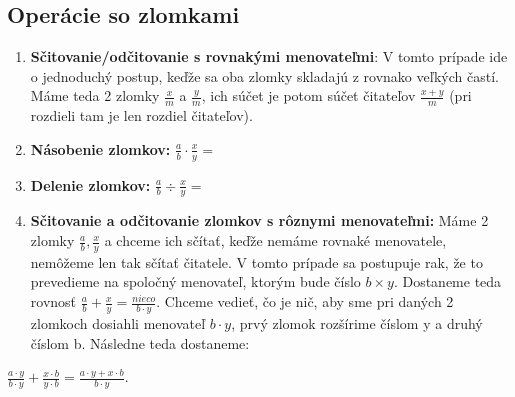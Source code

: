 \documentclass[12pt]{article}
\begin{document}
	\newpage
	\subsection{Operácie so zlomkami}
	\begin{enumerate}
		\item \textbf{Sčitovanie/odčitovanie s rovnakými menovateľmi}: V tomto prípade ide o jednoduchý postup, keďže sa oba zlomky skladajú z rovnako veľkých častí. Máme teda 2 zlomky $\frac{x}{m}$ a $\frac{y}{m}$, ich súčet je potom súčet čitateľov $\frac{x+y}{m}$ (pri rozdieli tam je len rozdiel čitateľov).
		
		\item \textbf{Násobenie zlomkov:} $\frac{a}{b} \cdot \frac{x}{y} = $
		\item \textbf{Delenie zlomkov:} $\frac{a}{b} \div \frac{x}{y} = $
		\item \textbf{Sčitovanie a odčitovanie zlomkov s rôznymi menovateľmi:} Máme 2 zlomky  $\frac{a}{b}, \frac{x}{y}$ a chceme ich sčítať, keďže nemáme rovnaké menovatele, nemôžeme len tak sčítať čitatele. V tomto prípade sa postupuje rak, že to prevedieme na spoločný menovateľ, ktorým bude číslo $b \times y$. Dostaneme teda rovnosť $\frac{a}{b} + \frac{x}{y} = \frac{nieco}{b \cdot y}$. Chceme vedieť, čo je nič, aby sme pri daných 2 zlomkoch dosiahli menovateľ $b \cdot y$, prvý zlomok rozšírime číslom y a druhý číslom b. Následne teda dostaneme:
	\end{enumerate}
	\begin{center}
		\LARGE $\frac{a \cdot y}{b \cdot y} + \frac{x \cdot b}{y \cdot b} = \frac{a \cdot y + x \cdot b}{b \cdot y}$.
		
	\end{center}
	
\end{document}
